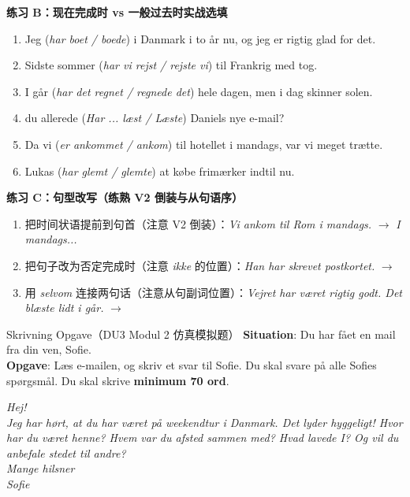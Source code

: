 \textbf{练习 B：现在完成时 vs 一般过去时实战选填}
\begin{enumerate}
  \item Jeg \underline{\hspace{2.2cm}} (\textit{har boet / boede}) i Danmark i to år nu, og jeg er rigtig glad for det.
  \item Sidste sommer \underline{\hspace{2.2cm}} (\textit{har vi rejst / rejste vi}) til Frankrig med tog.
  \item I går \underline{\hspace{2.2cm}} (\textit{har det regnet / regnede det}) hele dagen, men i dag skinner solen.
  \item \underline{\hspace{1.4cm}} du allerede \underline{\hspace{1.8cm}} (\textit{Har ... læst / Læste}) Daniels nye e-mail?
  \item Da vi \underline{\hspace{2.2cm}} (\textit{er ankommet / ankom}) til hotellet i mandags, var vi meget trætte.
  \item Lukas \underline{\hspace{2.2cm}} (\textit{har glemt / glemte}) at købe frimærker indtil nu.
\end{enumerate}

\textbf{练习 C：句型改写（练熟 V2 倒装与从句语序）}
\begin{enumerate}
  \item 把时间状语提前到句首（注意 V2 倒装）：\textit{Vi ankom til Rom i mandags.} $\rightarrow$ \textit{I mandags...}
  \item 把句子改为否定完成时（注意 \textit{ikke} 的位置）：\textit{Han har skrevet postkortet.} $\rightarrow$
  \item 用 \textit{selvom} 连接两句话（注意从句副词位置）：\textit{Vejret har været rigtig godt. Det blæste lidt i går.} $\rightarrow$
\end{enumerate}


\begin{emailbox}{Skrivning Opgave（DU3 Modul 2 仿真模拟题）}
\textbf{Situation}: Du har fået en mail fra din ven, Sofie.\\
\textbf{Opgave}: Læs e-mailen, og skriv et svar til Sofie. Du skal svare på alle Sofies spørgsmål. Du skal skrive \textbf{minimum 70 ord}.

\vspace{0.3em}
\textit{Hej!\\
Jeg har hørt, at du har været på weekendtur i Danmark. Det lyder hyggeligt! Hvor har du været henne? Hvem var du afsted sammen med? Hvad lavede I? Og vil du anbefale stedet til andre?\\
Mange hilsner\\
Sofie}
\end{emailbox}

